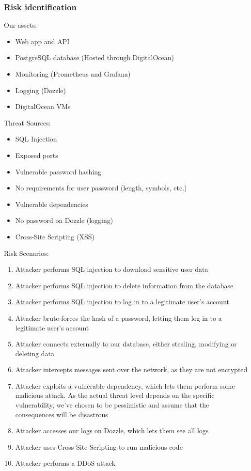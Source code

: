 \subsubsection{Risk identification}
Our assets:
\begin{itemize}
    \item Web app and API
    \item PostgreSQL database (Hosted through DigitalOcean)
    \item Monitoring (Prometheus and Grafana)
    \item Logging (Dozzle)
    \item DigitalOcean VMs
\end{itemize}

Threat Sources:
\begin{itemize}
    \item SQL Injection
    \item Exposed ports 
    \item Vulnerable password hashing
    \item No requirements for user password (length, symbols, etc.)
    \item Vulnerable dependencies
    \item No password on Dozzle (logging)
    \item Cross-Site Scripting (XSS)
\end{itemize}

Risk Scenarios:
\begin{enumerate}[label=\textbf{\Alph*}]
    \item Attacker performs SQL injection to download sensitive user data
    \item Attacker performs SQL injection to delete information from the database
    \item Attacker performs SQL injection to log in to a legitimate user's account
    \item Attacker brute-forces the hash of a password, letting them log in to a legitimate user's account
    \item Attacker connects externally to our database, either stealing, modifying or deleting data
    \item Attacker intercepts messages sent over the network, as they are not encrypted
    \item Attacker exploits a vulnerable dependency, which lets them perform some malicious attack. As the actual threat level depends on the specific vulnerability, we've chosen to be pessimistic and assume that the consequences will be disastrous
    \item Attacker accesses our logs on Dozzle, which lets them see all logs
    \item Attacker uses Cross-Site Scripting to run malicious code
    \item Attacker performs a DDoS attack
\end{enumerate}


